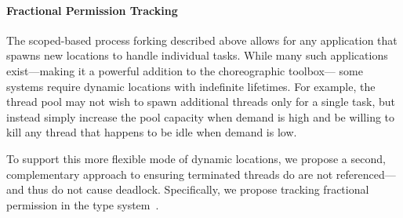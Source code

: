 

\paragraph{Fractional Permission Tracking}
The scoped-based process forking described above allows for any application that spawns new locations to handle individual tasks.
While many such applications exist---making it a powerful addition to the choreographic toolbox---%
some systems require dynamic locations with indefinite lifetimes.
For example, the thread pool may not wish to spawn additional threads only for a single task,
but instead simply increase the pool capacity when demand is high
and be willing to kill any thread that happens to be idle when demand is low.

To support this more flexible mode of dynamic locations, we propose a second, complementary approach to
ensuring terminated threads do are not referenced---and thus do not cause deadlock.
Specifically, we propose tracking fractional permission in the type system~.

